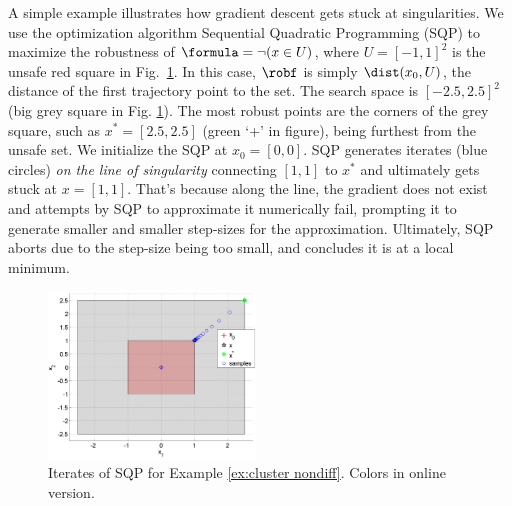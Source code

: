 \begin{exmp}
	\label{ex:cluster nondiff}
	A simple example illustrates how gradient descent gets stuck at singularities. We use the optimization algorithm Sequential Quadratic Programming (SQP) \cite{Polak97_Optim} to maximize the robustness of $\formula = \neg (x \in U)$, where $U=[-1,1]^2$ is the unsafe red square in Fig.~\ref{fig:DumbExample}.
	In this case, $\robf$ is simply $\dist(x_0,U)$, the distance of the first trajectory point to the set.
	The search space is $[-2.5,2.5]^2$ (big grey square in Fig. \ref{fig:DumbExample}). 
	The most robust points are the corners of the grey square, such as $x^* = [2.5,2.5]$ (green `+' in figure), being furthest from the unsafe set.
	We initialize the SQP at $x_0=[0,0]$. 
	SQP generates iterates (blue circles) \textit{on the line of singularity} connecting $[1,1]$ to $x^*$ and ultimately gets stuck at $x=[1,1]$.
	That's because along the line, the gradient does not exist and attempts by SQP to approximate it numerically fail, prompting it to generate smaller and smaller step-sizes for the approximation.
	Ultimately, SQP aborts due to the step-size being too small, and concludes it is at a local minimum.
\end{exmp}	
\begin{figure}[t]
\centering
\includegraphics[width=0.49\textwidth]{figures/DumbOptEx_scissored}
\vspace{-20pt}
\caption{{\small Iterates of SQP for Example \ref{ex:cluster nondiff}. Colors in online version.}}
\vspace{-10pt}
\label{fig:DumbExample}
\end{figure}



